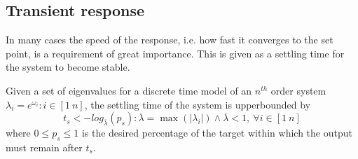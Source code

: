 \documentclass[sigconf]{llncs}
\begin{document}
\subsection{Transient response} 
\label{ssec:transientspecification}
In many cases the speed of the response, i.e. how fast it converges to the set point, is a requirement of great importance. 
This is given as a settling time for the system to become stable.
 
\begin{theorem}
Given a set of eigenvalues for a discrete time model of an $n^{th}$ order system $\lambda_i =e^{\omega_i}: i \in [1\ n]$, the settling time of the system is upperbounded by
\begin{equation}
t_s<-log_{\overline{\lambda}}({p_s}) : \overline{\lambda} = \max(|\lambda_i|) \wedge \overline{\lambda}<1,\ \forall i \in [1\ n]
\label{eq:set_time}
\end{equation}
where $0\leq p_s \leq 1$ is the desired percentage of the target within which the output must remain after $t_s$.
\end{theorem}
\end{document}

